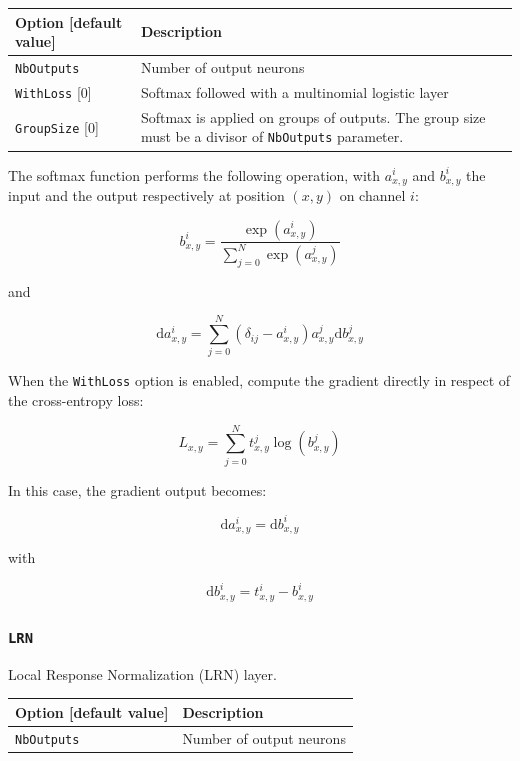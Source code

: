 \documentclass[a4paper,11pt,oneside]{article}
\begin{document}
\begin{center}
 \begin{longtable}{| p{5cm} | p{10cm} | }
 \hline
 Option [default value] & Description\\
 \hline\hline
  \cellcolor{requiredcolor}\lstinline!NbOutputs! & Number of output neurons \\
  \lstinline!WithLoss! [0] & Softmax followed with a multinomial logistic
  layer \\
  \lstinline!GroupSize! [0] & Softmax is applied on groups of outputs.
   The group size must be a divisor of \lstinline!NbOutputs! parameter.\\
 \hline
\end{longtable}
\end{center}

The softmax function performs the following operation, with $a_{x,y}^{i}$ and
$b_{x,y}^{i}$ the input and the output respectively at position $(x,y)$ on
channel $i$:

\[ b_{x,y}^{i} = \frac{\exp(a_{x,y}^{i})}{\sum\limits_{j=0}^{N}
    {\exp(a_{x,y}^{j})}} \]

and

\[ \text{d}a_{x,y}^{i} = \sum\limits_{j=0}^{N}{\left(\delta_{ij}
- a_{x,y}^{i}\right) a_{x,y}^{j} \text{d}b_{x,y}^{j}} \]


When the \lstinline!WithLoss! option is enabled, compute the gradient directly
in respect of the cross-entropy loss:

\[ L_{x,y} = \sum\limits_{j=0}^{N}{t_{x,y}^{j} \log(b_{x,y}^{j})} \]

In this case, the gradient output becomes:

\[ \text{d}a_{x,y}^{i} = \text{d}b_{x,y}^{i} \]

with

\[ \text{d}b_{x,y}^{i} = t_{x,y}^{i} - b_{x,y}^{i} \]


\subsubsection{\texorpdfstring{%
\lstinline[basicstyle=\ttfamily\bfseries]!LRN!}{LRN}}
Local Response Normalization (LRN) layer.

\begin{center}
 \begin{longtable}{| p{5cm} | p{10cm} | }
 \hline
 Option [default value] & Description\\
 \hline\hline
  \cellcolor{requiredcolor}\lstinline!NbOutputs! & Number of output neurons \\
 \hline
\end{longtable}
\end{center}
\end{document}
